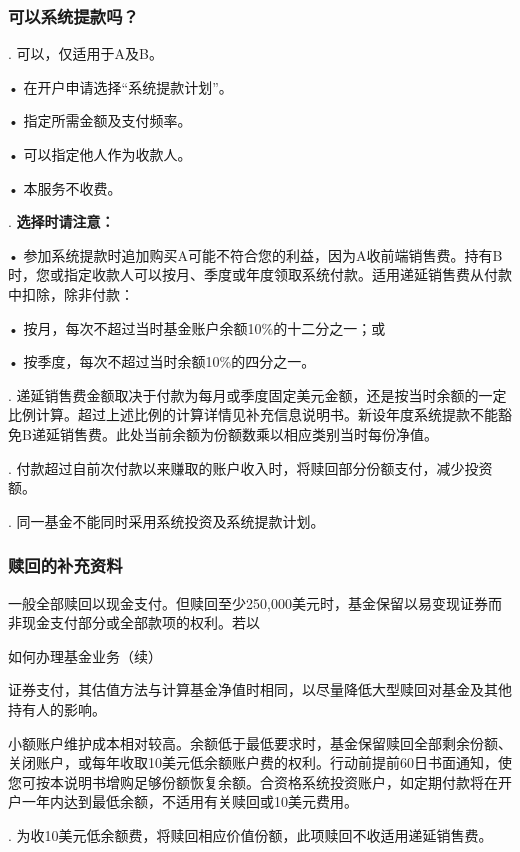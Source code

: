 \documentclass[UTF8,fontset=none,11pt,a4paper]{ctexart}
\begin{document}
\subsubsection*{可以系统提款吗？}
. 可以，仅适用于A及B。


\noindent • 在开户申请选择“系统提款计划”。\par\smallskip
\noindent • 指定所需金额及支付频率。\par\smallskip
\noindent • 可以指定他人作为收款人。\par\smallskip
\noindent • 本服务不收费。\par\smallskip
{}. \textbf{选择时请注意：}


\noindent • 参加系统提款时追加购买A可能不符合您的利益，因为A收前端销售费。持有B时，您或指定收款人可以按月、季度或年度领取系统付款。适用递延销售费从付款中扣除，除非付款：\par\smallskip
\noindent • 按月，每次不超过当时基金账户余额10\%的十二分之一；或\par\smallskip
\noindent • 按季度，每次不超过当时余额10\%的四分之一。\par\smallskip
{}. 递延销售费金额取决于付款为每月或季度固定美元金额，还是按当时余额的一定比例计算。超过上述比例的计算详情见补充信息说明书。新设年度系统提款不能豁免B递延销售费。此处当前余额为份额数乘以相应类别当时每份净值。


. 付款超过自前次付款以来赚取的账户收入时，将赎回部分份额支付，减少投资额。


. 同一基金不能同时采用系统投资及系统提款计划。


\subsubsection*{赎回的补充资料}
一般全部赎回以现金支付。但赎回至少250,000美元时，基金保留以易变现证券而非现金支付部分或全部款项的权利。若以


\par{}\label{originalpage20}
如何办理基金业务（续）

证券支付，其估值方法与计算基金净值时相同，以尽量降低大型赎回对基金及其他持有人的影响。

小额账户维护成本相对较高。余额低于最低要求时，基金保留赎回全部剩余份额、关闭账户，或每年收取10美元低余额账户费的权利。行动前提前60日书面通知，使您可按本说明书增购足够份额恢复余额。合资格系统投资账户，如定期付款将在开户一年内达到最低余额，不适用有关赎回或10美元费用。

. 为收10美元低余额费，将赎回相应价值份额，此项赎回不收适用递延销售费。
\end{document}
